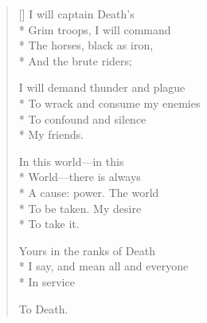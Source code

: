 \label{ch:lear_bb}
\settowidth{\versewidth}{I say,   and mean all and everyone}
\begin{verse}[\versewidth]
I will captain Death's\\*
Grim troops, I will command\\*
The horses, black as iron,\\*
And the brute riders;

I will demand thunder and plague\\*
To wrack and consume my enemies\\*
To confound and silence\\*
My friends.

\qquad In this world---in this\\*
World---there is always\\*
A cause: power.   The world\\*
To be taken.   My desire\\*
To take it.

Yours in the ranks of Death\\*
I say,   and mean all and everyone\\*
In service

To Death.
\end{verse}
